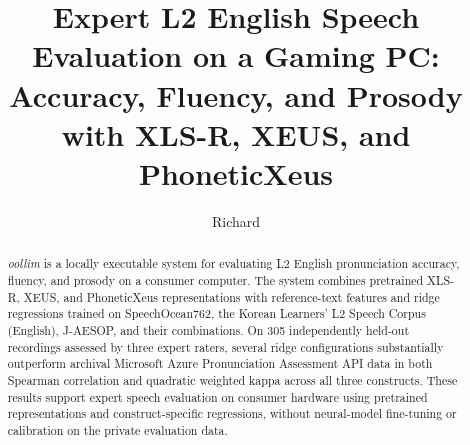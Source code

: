 \documentclass[cameraready]{Interspeech}
\title{Expert L2 English Speech Evaluation on a Gaming PC:\\Accuracy, Fluency, and Prosody with XLS-R, XEUS, and PhoneticXeus}
\author[affiliation={1}]{Richard}{Rose}
\begin{document}
\maketitle
\begin{abstract}
\textit{oollim} is a locally executable system for evaluating L2 English pronunciation accuracy, fluency, and prosody on a consumer computer. The system combines pretrained XLS-R, XEUS, and PhoneticXeus representations with reference-text features and ridge regressions trained on SpeechOcean762, the Korean Learners' L2 Speech Corpus (English), J-AESOP, and their combinations. On 305 independently held-out recordings assessed by three expert raters, several ridge configurations substantially outperform archival Microsoft Azure Pronunciation Assessment API data in both Spearman correlation and quadratic weighted kappa across all three constructs. These results support expert speech evaluation on consumer hardware using pretrained representations and construct-specific regressions, without neural-model fine-tuning or calibration on the private evaluation data.
\end{abstract}
\end{document}
